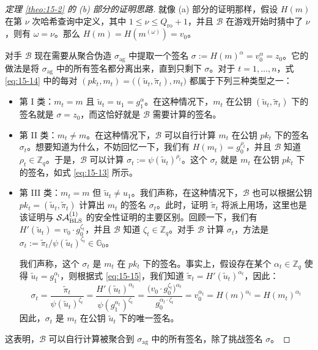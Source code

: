 \begin{proof}[定理 \ref{theo:15-2} 的 (b) 部分的证明思路]
就像 (a) 部分的证明那样，假设 $H(m)$ 在第 $\nu$ 次哈希查询中定义，其中 $1\leq\nu\leq Q_\mathrm{ro}+1$，并且 $\mathcal{B}$ 在游戏开始时猜中了 $\nu$，则有 $\omega=\nu$。那么 $H(m)=H(m^{(\omega)})=v_0$。

对手 $\mathcal{B}$ 现在需要从聚合伪造 $\sigma_\mathrm{ag}$ 中提取一个签名 $\sigma:=H(m)^\alpha=v_0^\alpha=z_0$。它的做法是将 $\sigma_\mathrm{ag}$ 中的所有签名都分离出来，直到只剩下 $\sigma$。对于 $t=1,\dots,n$，式 \ref{eq:15-14} 中的每对 $(pk_t,m_t)=\big((\tilde{u}_t,\tilde{\pi}_t),m_t\big)$ 都属于下列三种类型之一：
\begin{itemize}
	\item 第 I 类：$m_t=m$ 且 $\tilde{u}_t=u_1=g_1^\alpha$。在这种情况下，$m_t$ 在公钥 $(\tilde{u}_t,\tilde{\pi}_t)$ 下的签名就是 $\sigma=z_0$，而这恰好就是 $\mathcal{B}$ 需要计算的签名。
	\item 第 II 类：$m_t\neq m$。在这种情况下，$\mathcal{B}$ 可以自行计算 $m_t$ 在公钥 $pk_t$ 下的签名 $\sigma_t$。想要知道为什么，不妨回忆一下，我们有 $H(m_t)=g_0^{\rho_t}$，并且 $\mathcal{B}$ 知道 $\rho_t\in\mathbb{Z}_q$。于是，$\mathcal{B}$ 可以计算 $\sigma_t:=\psi(\tilde{u}_t)^{\rho_t}$。这个 $\sigma_t$ 就是 $m_t$ 在公钥 $pk_t$ 下的签名，如式 \ref{eq:15-13} 所示。
	\item 第 III 类：$m_t=m$ 但 $\tilde{u}_t\neq u_1$。我们声称，在这种情况下，$\mathcal{B}$ 也可以根据公钥 $pk_t=(\tilde{u}_t,\tilde{\pi}_t)$ 计算出 $m_t$ 的签名 $\sigma_t$。此时，证明 $\tilde{\pi}_t$ 将派上用场，这里也是该证明与 $\mathcal{SA}_{\rm BLS}^{(1)}$ 的安全性证明的主要区别。回顾一下，我们有 $H'(\tilde{u}_t)=v_0\cdot g_0^{\zeta_t}$，并且 $\mathcal{B}$ 知道 $\zeta_t\in\mathbb{Z}_q$。对手 $\mathcal{B}$ 计算 $\sigma_t$，方法是 $\sigma_t:=\tilde{\pi}_t/\psi(\tilde{u}_t)^{\zeta_t}\in\mathbb{G}_0$。
	
		我们声称，这个 $\sigma_t$ 是 $m_t$ 在 $pk_t$ 下的签名。事实上，假设存在某个 $\alpha_t\in\mathbb{Z}_q$ 使得 $\tilde{u}_t=g_1^{\alpha_t}$，则根据式 \ref{eq:15-15}，我们知道 $\tilde{\pi}_t=H'(\tilde{u}_t)^{\alpha_t}$，因此：
		\[
		\sigma_t=\frac{\tilde{\pi}_t}{\psi(\tilde{u}_t)^{\zeta_t}}
		=\frac{H'(\tilde{u}_t)^{\alpha_t}}{\psi(g_1^{\alpha_t})^{\zeta_t}}
		=\frac{\big(v_0\cdot g_0^{\zeta_t}\big)^{\alpha_t}}{g_0^{\alpha_t\cdot\zeta_t}}
		=v_0^{\alpha_t}
		=H(m)^{\alpha_t}
		=H(m_t)^{\alpha_t}
		\]
		因此，$\sigma_t$ 是 $m_t$ 在公钥 $\tilde{u}_t$ 下的唯一签名。
\end{itemize}
这表明，$\mathcal{B}$ 可以自行计算被聚合到 $\sigma_\mathrm{ag}$ 中的所有签名，除了挑战签名 $\sigma$。


\end{proof}
